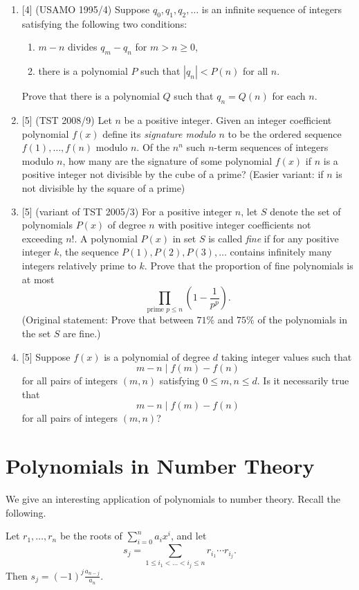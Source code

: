 \begin{enumerate}
\item{}[4] (USAMO 1995/4) Suppose $q_0,q_1,q_2,\ldots$ is an infinite sequence of integers satisfying the following two conditions:
\begin{enumerate}
\item $m-n$ divides $q_m-q_n$ for $m>n\geq 0$,
\item there is a polynomial $P$ such that $|q_n|<P(n)$ for all $n$.
\end{enumerate}
Prove that there is a polynomial $Q$ such that $q_n=Q(n)$ for each $n$.

\item{}[5] (TST 2008/9) Let $n$ be a positive integer. Given an integer coefficient polynomial $f(x)$ define its \emph{signature modulo} $n$ to be the ordered sequence $f(1),\ldots, f(n)$ modulo $n$. Of the $n^n$ such $n$-term sequences of integers modulo $n$, how many are the signature of some polynomial $f(x)$ if $n$ is a positive integer not divisible by the cube of a prime? (Easier variant: if $n$ is not divisible hy the square of a prime)

\item{}[5] (variant of TST 2005/3) For a positive integer $n$, let $S$ denote the set of polynomials $P(x)$ of degree $n$ with positive integer coefficients not exceeding $n!$. A polynomial $P(x)$ in set $S$ is called \emph{fine} if for any positive integer $k$, the sequence $P(1),P(2),P(3),\ldots$ contains infinitely many integers relatively prime to $k$. %
Prove that the proportion of fine polynomials is at most 
\[\prod_{\text{prime }p\leq n} \left(1-\frac{1}{p^p}\right).\]
(Original statement: Prove that between $71 \%$ and $75\%$ of the polynomials in the set $S$ are fine.)

\item{}[5] Suppose $f(x)$ is a polynomial of degree $d$ taking integer values such that
\[m-n\mid{f(m)-f(n)}\]
for all pairs of integers $(m,n)$ satisfying $0\leq m,n\leq d$. Is it necessarily true that
\[m-n\mid{f(m)-f(n)}\]
for all pairs of integers $(m,n)$?
\end{enumerate}

\section{Polynomials in Number Theory}\label{poly2s3}
We give an interesting application of polynomials to number theory. Recall the following.
\begin{thm}
Let $r_1,\ldots, r_n$ be the roots of $\sum_{i=0}^n a_ix^i$, and let \[s_j=\sum_{1\leq i_1<\ldots<i_j\leq n}r_{i_1}\cdots r_{i_j}.\] Then $s_j=(-1)^j\frac{a_{n-j}}{a_n}$.
\end{thm}

